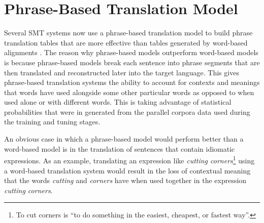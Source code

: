 \section{Phrase-Based Translation Model}
Several SMT systems now use a phrase-based translation model to build phrase translation tables that are more effective than tables generated by word-based alignments \cite[p. 48]{koehn2003statistical}. The reason why phrase-based models outperform word-based models is because phrase-based models break each sentence into phrase segments that are then translated and reconstructed later into the target language. This gives phrase-based translation systems the ability to account for contexts and meanings that words have used alongside some other particular words as opposed to when used alone or with different words. This is taking advantage of statistical probabilities that were in generated from the parallel corpora data used during the training and tuning stages. 

An obvious case in which a phrase-based model would perform better than a word-based model is in the translation of sentences that contain idiomatic expressions. As an example, translating an expression like \textit{cutting corners}\footnote{To cut corners is ``to do something in the easiest, cheapest, or fastest way''\cite{cutcornerscambridge}.} using a word-based translation system would result in the loss of contextual meaning that the words \textit{cutting} and \textit{corners} have when used together in the expression \textit{cutting corners}.

